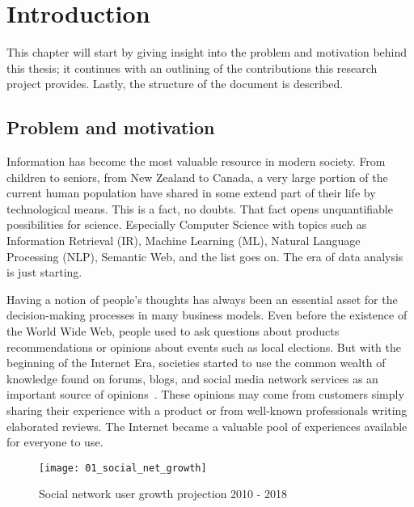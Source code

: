 
\chapter{Introduction}
\label{sec:Introduction}

This chapter will start by giving insight into the problem and motivation behind this
thesis; it continues with an outlining of the contributions this research project provides. Lastly, the structure of the document is described.


\section{Problem and motivation}


Information has become the most valuable resource in modern society. From children to seniors, from New Zealand to Canada, a very large portion of the current human population have shared in some extend part of their life by technological means. This is a fact, no doubts. That fact opens unquantifiable possibilities for science. Especially Computer Science with topics such as Information Retrieval (IR), Machine Learning (ML), Natural Language Processing (NLP), Semantic Web, and the list goes on. The era of data analysis is just starting. 


Having a notion of people’s thoughts has always been an essential asset for the decision-making processes in many business models. Even before the existence of the World Wide Web, people used to ask questions about products recommendations or opinions about events such as local elections. But with the beginning of the Internet Era, societies started to use the common wealth of knowledge found on forums, blogs, and social media network services as an important source of opinions~\cite{pang2008opinion}. These opinions may come from customers simply sharing their experience with a product or from well-known professionals writing elaborated reviews. The Internet became a valuable pool of experiences available for everyone to use.

\clearpage

\begin{figure}
    \centering
    \caption[Social network user growth projections]{Social network user growth projection 2010 - 2018{~\cite{stat2018}}}
    \texttt{[image: 01\_social\_net\_growth]}
    \label{fig1:social_net_growth}
\end{figure}

